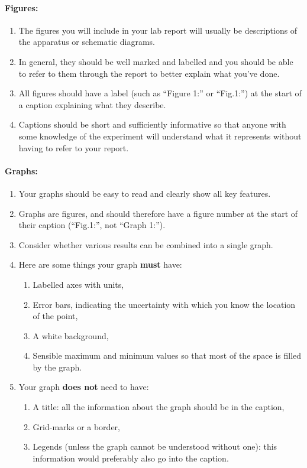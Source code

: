 \paragraph{Figures:} 
\begin{enumerate}
    \item The figures you will include in your lab report will usually be descriptions of the apparatus or schematic diagrams. 
    \item In general, they should be well marked and labelled and you should be able to refer to them through the report to better explain what you've done. 
    \item All figures should have a label (such as ``Figure 1:'' or ``Fig.1:'') at the start of a caption explaining what they describe. 
    \item Captions should be short and sufficiently informative so that anyone with some knowledge of the experiment will understand what it represents without having to refer to your report.
\end{enumerate}

\paragraph{Graphs:}
\begin{enumerate}
    \item Your graphs should be easy to read and clearly show all key features.
    \item Graphs are figures, and should therefore have a figure number at the start of their caption (``Fig.1:'', not ``Graph 1:'').
    \item Consider whether various results can be combined into a single graph.
    \item Here are some things your graph \textbf{must} have:
    
    \begin{enumerate}
        \item Labelled axes with units,
        \item Error bars, indicating the uncertainty with which you know the location of the point,
        \item A white background,
        \item Sensible maximum and minimum values so that most of the space is filled by the graph.
    \end{enumerate}
    
    \item Your graph \textbf{does not} need to have:
    
    \begin{enumerate}
        \item A title: all the information about the graph should be in the caption,
        \item Grid-marks or a border,
        \item Legends (unless the graph cannot be understood without one): this information would preferably also go into the caption.
    \end{enumerate}

\end{enumerate}


